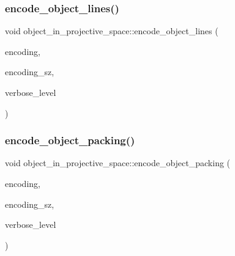 \subsubsection{\texorpdfstring{encode\+\_\+object\+\_\+lines()}{encode\_object\_lines()}}
{\footnotesize\ttfamily void object\+\_\+in\+\_\+projective\+\_\+space\+::encode\+\_\+object\+\_\+lines (\begin{DoxyParamCaption}\item[{\mbox{\hyperlink{galois_8h_a09fddde158a3a20bd2dcadb609de11dc}{I\+NT}} $\ast$\&}]{encoding,  }\item[{\mbox{\hyperlink{galois_8h_a09fddde158a3a20bd2dcadb609de11dc}{I\+NT}} \&}]{encoding\+\_\+sz,  }\item[{\mbox{\hyperlink{galois_8h_a09fddde158a3a20bd2dcadb609de11dc}{I\+NT}}}]{verbose\+\_\+level }\end{DoxyParamCaption})}

\mbox{\label{classobject__in__projective__space_af83064813b2e471be045e74620c134df}} 
\subsubsection{\texorpdfstring{encode\+\_\+object\+\_\+packing()}{encode\_object\_packing()}}
{\footnotesize\ttfamily void object\+\_\+in\+\_\+projective\+\_\+space\+::encode\+\_\+object\+\_\+packing (\begin{DoxyParamCaption}\item[{\mbox{\hyperlink{galois_8h_a09fddde158a3a20bd2dcadb609de11dc}{I\+NT}} $\ast$\&}]{encoding,  }\item[{\mbox{\hyperlink{galois_8h_a09fddde158a3a20bd2dcadb609de11dc}{I\+NT}} \&}]{encoding\+\_\+sz,  }\item[{\mbox{\hyperlink{galois_8h_a09fddde158a3a20bd2dcadb609de11dc}{I\+NT}}}]{verbose\+\_\+level }\end{DoxyParamCaption})}

\mbox{\label{classobject__in__projective__space_a46edc8e2e918819dd5fc880eb52177b8}} 
